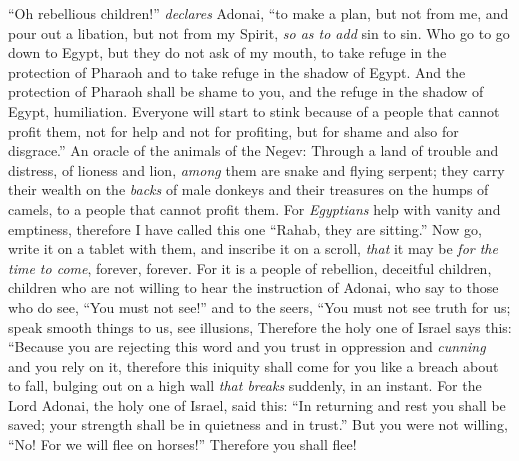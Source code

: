 \begin{biblechapter} %
 “Oh rebellious children!” \textit{declares} Adonai,
\verse “to make a plan, but not from me, 
and pour out a libation, but not from my Spirit, 
\textit{so as to add} sin to sin.
\verse Who go to go down to Egypt, 
but they do not ask of my mouth, 
to take refuge in the protection of Pharaoh 
and to take refuge in the shadow of Egypt.
\verse And the protection of Pharaoh shall be shame to you, 
and the refuge in the shadow of Egypt, humiliation.
\verse Everyone will start to stink because of a people that cannot profit them, not for help and not for profiting, 
but for shame and also for disgrace.”
 An oracle of the animals of the Negev:
\verse Through a land of trouble and distress, 
of lioness and lion, 
\textit{among} them are snake and flying serpent; 
they carry their wealth on the \textit{backs} of male donkeys 
and their treasures on the humps of camels, 
to a people that cannot profit them.
\verse For \textit{Egyptians} help with vanity and emptiness, 
therefore I have called this one “Rahab, they are sitting.”
\verse Now go, write it on a tablet with them, 
and inscribe it on a scroll, 
\textit{that} it may be \textit{for the time to come}, 
forever, forever.
\verse For it is a people of rebellion, deceitful children, 
children who are not willing to hear the instruction of Adonai,
\verse who say to those who do see, “You must not see!” 
and to the seers, “You must not see truth for us; 
speak smooth things to us, 
see illusions,
\verse Therefore the holy one of Israel says this:
\verse “Because you are rejecting this word 
and you trust in oppression and \textit{cunning} 
and you rely on it,
\verse therefore this iniquity shall come for you like a breach about to fall, 
bulging out on a high wall \textit{that breaks} suddenly, in an instant.
\verse For the Lord Adonai, the holy one of Israel, said this: “In returning and rest you shall be saved; 
your strength shall be in quietness and in trust.”
\verse But you were not willing,
\verse “No! For we will flee on horses!” Therefore you shall flee! 

\end{biblechapter}
